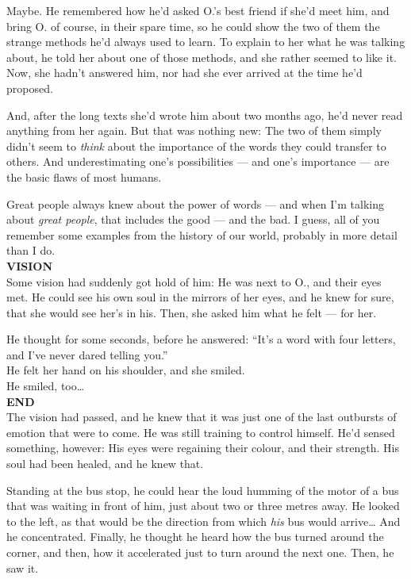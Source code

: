 Maybe. He remembered how he'd asked O.'s best friend if she'd meet him, and bring O. of course, in their spare time, so he could show the two of them the strange methods he'd always used to learn. To explain to her what he was talking about, he told her about one of those methods, and she rather seemed to like it. 
Now, she hadn't answered him, nor had she ever arrived at the time he'd proposed.

And, after the long texts she'd wrote him about two months ago, he'd never read anything from her again. 
But that was nothing new: The two of them simply didn't seem to \emph{think} about the importance of the words they could transfer to others. And underestimating one's possibilities --- and one's importance --- are the basic flaws of most humans.

Great people always knew about the power of words --- and when I'm talking about \emph{great people}, that includes the good --- and the bad. 
I guess, all of you remember some examples from the history of our world, probably in more detail than I do.\\
\textbf{VISION}\\
Some vision had suddenly got hold of him: He was next to O., and their eyes met. He could see his own soul in the mirrors of her eyes, and he knew for sure, that she would see her's in his. 
Then, she asked him what he felt --- for her.

He thought for some seconds, before he answered: \enquote{It's a word with four letters, and I've never dared telling you.}\\
He felt her hand on his shoulder, and she smiled.\\
He smiled, too\ldots\\
\textbf{END}\\
The vision had passed, and he knew that it was just one of the last outbursts of emotion that were to come. He was still training to control himself. 
He'd sensed something, however: His eyes were regaining their colour, and their strength. His soul had been healed, and he knew that.

Standing at the bus stop, he could hear the loud humming of the motor of a bus that was waiting in front of him, just about two or three metres away. He looked to the left, as that would be the direction from which \emph{his} bus would arrive\ldots
And he concentrated. Finally, he thought he heard how the bus turned around the corner, and then, how it accelerated just to turn around the next one. 
Then, he saw it.


